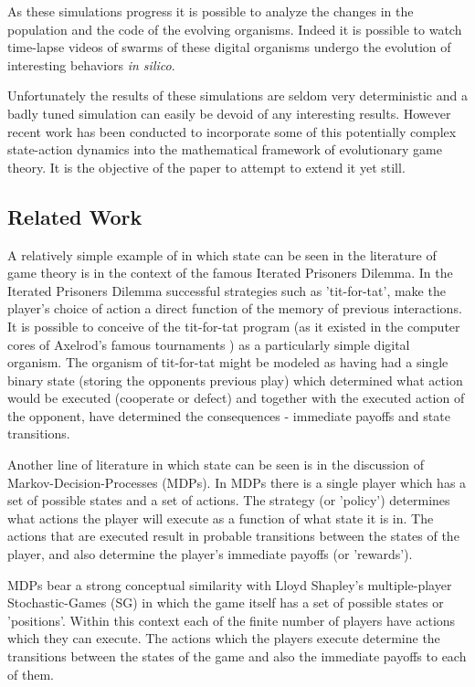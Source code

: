 As these simulations progress it is possible to analyze the changes in the population and the code of the evolving organisms. Indeed it is possible to watch time-lapse videos of swarms of these digital organisms undergo the evolution of interesting behaviors \textit{in silico}.

Unfortunately the results of these simulations are seldom very deterministic and a badly tuned simulation can easily be devoid of any interesting results. However recent work has been conducted to incorporate some of this potentially complex state-action dynamics into the mathematical framework of evolutionary game theory. It is the objective of the paper to attempt to extend it yet still.

\subsection{Related Work}\label{sec:-1}

A relatively simple example of in which state can be seen in the literature of game theory is in the context of the famous Iterated Prisoners Dilemma. In the Iterated Prisoners Dilemma successful strategies such as 'tit-for-tat', make the player's choice of action a direct function of the memory of previous interactions. It is possible to conceive of the tit-for-tat program (as it existed in the computer cores of Axelrod's famous tournaments \cite{spacial4}) as a particularly simple digital organism.
The organism of tit-for-tat might be modeled as having had a single binary state (storing the opponents previous play) which determined what action would be executed (cooperate or defect) and together with the executed action of the opponent, have determined the consequences - immediate payoffs and state transitions.

Another line of literature in which state can be seen is in the discussion of Markov-Decision-Processes (MDPs). In MDPs there is a single player which has a set of possible states and a set of actions. The strategy (or 'policy') determines what actions the player will execute as a function of what state it is in. The actions that are executed result in probable transitions between the states of the player, and also determine the player's immediate payoffs (or 'rewards').

MDPs bear a strong conceptual similarity with Lloyd Shapley's multiple-player Stochastic-Games (SG) \cite{shapley53}\cite{Solan2015} in which the game itself has a set of possible states or 'positions'. Within this context each of the finite number of players have actions which they can execute. The actions which the players execute determine the transitions between the states of the game and also the immediate payoffs to each of them.

